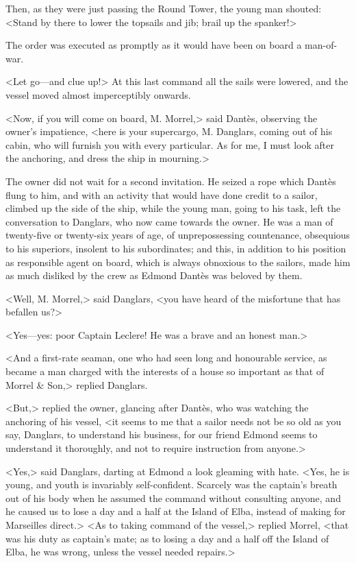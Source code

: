  Then, as they were just passing the Round Tower, the young man shouted: <Stand by there to lower the topsails and jib; brail up the spanker!> 

 The order was executed as promptly as it would have been on board a man-of-war. 

 <Let go—and clue up!> At this last command all the sails were lowered, and the vessel moved almost imperceptibly onwards. 

 <Now, if you will come on board, M. Morrel,> said Dantès, observing the owner's impatience, <here is your supercargo, M. Danglars, coming out of his cabin, who will furnish you with every particular. As for me, I must look after the anchoring, and dress the ship in mourning.> 

 The owner did not wait for a second invitation. He seized a rope which Dantès flung to him, and with an activity that would have done credit to a sailor, climbed up the side of the ship, while the young man, going to his task, left the conversation to Danglars, who now came towards the owner. He was a man of twenty-five or twenty-six years of age, of unprepossessing countenance, obsequious to his superiors, insolent to his subordinates; and this, in addition to his position as responsible agent on board, which is always obnoxious to the sailors, made him as much disliked by the crew as Edmond Dantès was beloved by them. 

 <Well, M. Morrel,> said Danglars, <you have heard of the misfortune that has befallen us?> 

 <Yes—yes: poor Captain Leclere! He was a brave and an honest man.> 

 <And a first-rate seaman, one who had seen long and honourable service, as became a man charged with the interests of a house so important as that of Morrel \& Son,> replied Danglars. 

 <But,> replied the owner, glancing after Dantès, who was watching the anchoring of his vessel, <it seems to me that a sailor needs not be so old as you say, Danglars, to understand his business, for our friend Edmond seems to understand it thoroughly, and not to require instruction from anyone.> 

 <Yes,> said Danglars, darting at Edmond a look gleaming with hate. <Yes, he is young, and youth is invariably self-confident. Scarcely was the captain's breath out of his body when he assumed the command without consulting anyone, and he caused us to lose a day and a half at the Island of Elba, instead of making for Marseilles direct.>  <As to taking command of the vessel,> replied Morrel, <that was his duty as captain's mate; as to losing a day and a half off the Island of Elba, he was wrong, unless the vessel needed repairs.> 

